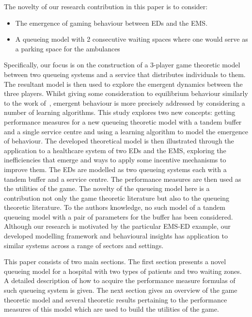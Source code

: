 The novelty of our research contribution in this paper is to consider:
\begin{itemize}
    \item The emergence of gaming behaviour between EDs and the EMS.
    \item A queueing model with 2 consecutive waiting spaces where one would 
    serve as a parking space for the ambulances
\end{itemize}
Specifically, our focus is on the construction of a 3-player game theoretic 
model between two queueing systems and a service that distributes individuals
to them. 
The resultant model is then used to explore the emergent dynamics between 
the three players.
Whilst giving some consideration to equilibrium behaviour similarly to the 
work of~\cite{FirmCompetition, FirmCompetition2, deo2011centralized, 
veltman2005equilibrium}, emergent behaviour is more precisely addressed by 
considering a number of learning algorithms.
This study explores two new concepts: getting performance measures for a new
queueing theoretic model with a tandem buffer and a single service centre and 
using a learning algorithm to model the emergence of behaviour.
The developed theoretical model is then illustrated through the application to 
a healthcare system of two EDs and the EMS, exploring the inefficiencies that 
emerge and ways to apply some incentive mechanisms to improve them.
The EDs are modelled as two queueing systems each with a tandem buffer and a 
service centre. 
The performance measures are then used as the utilities of the game.
The novelty of the queueing model here is a contribution not only the game 
theoretic literature but also to the queueing theoretic literature.
To the authors knowledge, no such model of a tandem queueing model with a pair 
of parameters for the buffer has been considered.
Although our research is motivated by the particular EMS-ED example, our 
developed modelling framework and behavioural insights has application to 
similar systems across a range of sectors and settings. 

This paper consists of two main sections.
The first section presents a novel queueing model for a hospital with two
types of patients and two waiting zones.
A detailed description of how to acquire the performance measure formulas of 
such queueing system is given.
The next section gives an overview of the game theoretic model and several
theoretic results pertaining to the performance measures of this model which 
are used to build the utilities of the game.